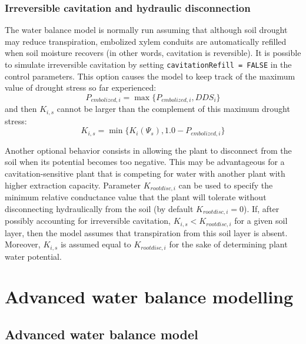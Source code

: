 \documentclass[]{book}
\begin{document}
\hypertarget{irreversible-cavitation-and-hydraulic-disconnection}{%
\section{Irreversible cavitation and hydraulic disconnection}\label{irreversible-cavitation-and-hydraulic-disconnection}}

The water balance model is normally run assuming that although soil drought may
reduce transpiration, embolized xylem conduits are automatically refilled when
soil moisture recovers (in other words, cavitation is reversible). It is possible
to simulate irreversible cavitation by setting \texttt{cavitationRefill\ =\ FALSE} in the control parameters. This option causes the model to keep track of the maximum value of drought stress so far experienced:
\begin{equation}
P_{embolized,i}= \max \{P_{embolized,i}, DDS_i \}
\end{equation}
and then \(K_{i,s}\) cannot be larger than the complement of this maximum drought
stress:
\begin{equation}
K_{i,s} = \min \{K_{i}(\Psi_s), 1.0 - P_{embolized,i} \}
\end{equation}

Another optional behavior consists in allowing the plant to disconnect from the
soil when its potential becomes too negative. This may be advantageous for a
cavitation-sensitive plant that is competing for water with another plant with
higher extraction capacity. Parameter \(K_{rootdisc,i}\) can be used to specify the
minimum relative conductance value that the plant will tolerate without
disconnecting hydraulically from the soil (by default \(K_{rootdisc,i} = 0\)).
If, after possibly accounting for irreversible cavitation, \(K_{i,s}<K_{rootdisc,i}\)
for a given soil layer, then the model assumes that transpiration from this soil
layer is absent. Moreover, \(K_{i,s}\) is assumed equal to \(K_{rootdisc,i}\) for the
sake of determining plant water potential.

\hypertarget{part-advanced-water-balance-modelling}{%
\part{Advanced water balance modelling}\label{part-advanced-water-balance-modelling}}

\hypertarget{advanced-water-balance-model}{%
\chapter{Advanced water balance model}\label{advanced-water-balance-model}}
\end{document}
